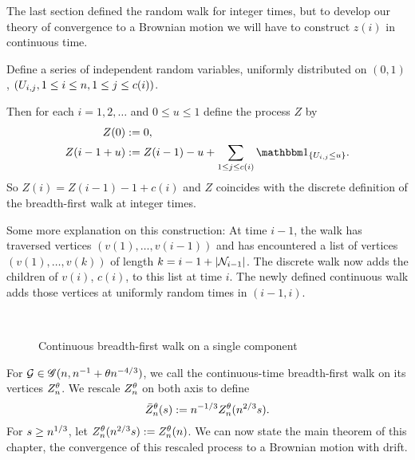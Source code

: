 The last section defined the random walk for integer times,
but to develop our theory of convergence to a Brownian motion
we will have to construct $z(i)$ in continuous time.

Define a series of independent random variables, 
uniformly distributed on $(0,1)$, 
$(U_{i,j}, 1 \leq i \leq n, 1 \leq j \leq c(i))$.

Then for each $i = 1, 2, \dots$ and $0 \leq u \leq 1$ define the process $Z$ by
\begin{equation} \label{E: def Z}
\begin{aligned}
Z(0) &:= 0, \\
Z(i - 1 + u) &:= Z(i-1) - u + \sum_{1 \leq j \leq c(i)} \Ind{\{ \Uij \leq u \}}.
\end{aligned}
\end{equation}
So $Z(i) = Z(i-1) - 1 + c(i)$ 
and $Z$ coincides with the discrete definition of the breadth-first walk at integer times.

Some more explanation on this construction:
At time $i-1$, 
the walk has traversed vertices
$(v(1), \dots, v(i-1))$
and has encountered a list of vertices
$(v(1), \dots, v(k))$
of length
$k = i-1 + |\mathcal{N}_{i-1}|$.
The discrete walk now adds the children of $v(i)$,
$c(i)$, to this list at time $i$.
The newly defined continuous walk adds those vertices at uniformly random times in $(i-1, i)$.

\begin{figure}[H]
	\centering
	\\
	
	\centering
	
	\caption{Continuous breadth-first walk on a single component}
	\label{F: bf-walk cont}
\end{figure} 


For $\mathcal{G} \in \mathscr{G}(n, n^{-1} + \theta n^{-4/3})$, 
we call the continuous-time breadth-first walk on its vertices $Z_n^{\theta}$.
We rescale $Z_n^{\theta}$ on both axis to define
\begin{equation} \label{E: def Zbar}
\bar{Z}_n^{\theta}(s) := n^{-1 / 3} Z_n^{\theta}(n^{2 / 3}s).
\end{equation}
For $s \geq n^{1 / 3}$, 
let $Z_n^{\theta}(n^{2 / 3}s) := Z_n^{\theta}(n)$.
We can now state the main theorem of this chapter,
the convergence of this rescaled process to a Brownian motion with drift.


